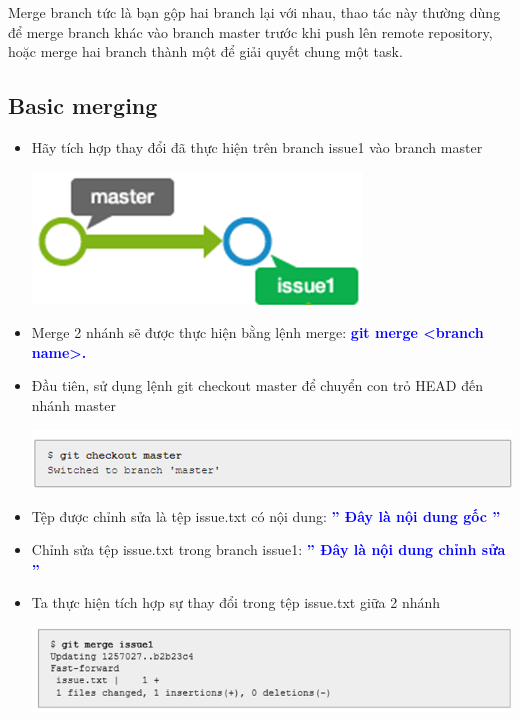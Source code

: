 \documentclass[12pt,a4paper]{report}
\begin{document}
Merge branch tức là bạn gộp hai branch lại với nhau, thao tác này thường dùng để merge branch khác vào branch master trước khi push lên remote repository, hoặc merge hai branch thành một để giải quyết chung một task.	
\subsection{Basic merging}
\begin{itemize}
 \item Hãy tích hợp thay đổi đã thực hiện trên branch issue1 vào branch master

	\includegraphics[width=0.8\linewidth]{screenshot060}

	\label{fig:screenshot060}	

\item Merge 2 nhánh sẽ được thực hiện bằng lệnh merge: \textcolor{blue}{\bf git merge <branch name>.}
\item Đầu tiên, sử dụng lệnh git checkout master để chuyển con trỏ HEAD đến nhánh master	

	\includegraphics[width=0.8\linewidth]{screenshot061}

	\label{fig:screenshot061}

\item Tệp được chỉnh sửa là tệp issue.txt có nội dung: \textcolor{blue}{\bf ''  Đây là nội dung gốc ''}	
\item Chỉnh sửa tệp issue.txt trong branch issue1: \textcolor{blue}{\bf '' Đây là nội dung chỉnh sửa ''}
\item Ta thực hiện tích hợp sự thay đổi trong tệp issue.txt giữa 2 nhánh

	\includegraphics[width=0.8\linewidth]{screenshot01}


\end{itemize}
\end{document}
